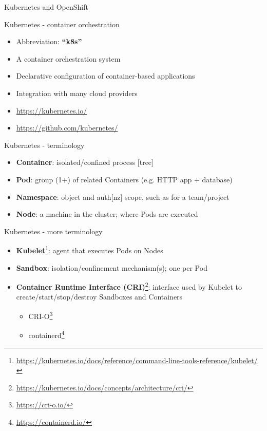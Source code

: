 \documentclass[ignorenonframetext,aspectratio=169,12pt]{beamer}
\begin{document}
\begin{frame}[plain]
\centering
\huge Kubernetes and OpenShift
\end{frame}


\begin{frame}{Kubernetes - container orchestration}
\protect\hypertarget{kubernetes-intro}{}

\begin{itemize}
\item Abbreviation: {\bf ``k8s''}
\item A container orchestration system
\item Declarative configuration of container-based applications
\item Integration with many cloud providers
\item \url{https://kubernetes.io/}
\item \url{https://github.com/kubernetes/}
\end{itemize}

\end{frame}


\begin{frame}{Kubernetes - terminology}
\protect\hypertarget{kubernetes-terminology}{}

\begin{itemize}
\item {\bf Container}: isolated/confined process [tree]
\item {\bf Pod}: group (1+) of related Containers (e.g. HTTP app + database)
\item {\bf Namespace}: object and auth[nz] scope, such as for a team/project
\item {\bf Node}: a machine in the cluster; where Pods are executed
\end{itemize}

\end{frame}

\begin{frame}{Kubernetes - more terminology}
\protect\hypertarget{kubernetes-terminology-2}{}
\begin{itemize}

\item {\bf
  Kubelet}\footnote{\url{https://kubernetes.io/docs/reference/command-line-tools-reference/kubelet/}}:
  agent that executes Pods on Nodes

\item {\bf Sandbox}: isolation/confinement mechanism(s); one per Pod
\item {\bf Container Runtime Interface
  (CRI)}\footnote{\url{https://kubernetes.io/docs/concepts/architecture/cri/}}:
  interface used by Kubelet to create/start/stop/destroy Sandboxes and
  Containers
  \begin{itemize}
  \item CRI-O\footnote{\url{https://cri-o.io/}}
  \item containerd\footnote{\url{https://containerd.io/}}
  \end{itemize}
\end{itemize}
\end{frame}
\end{document}
